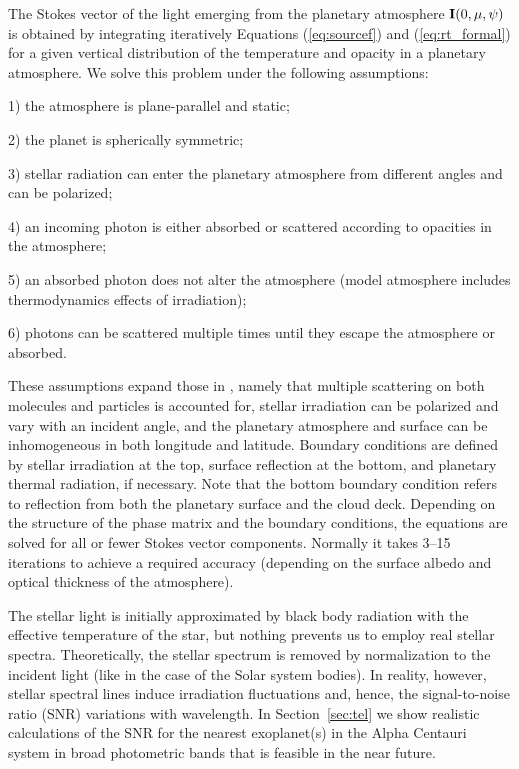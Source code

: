 \documentclass{emulateapj}
\begin{document}
The Stokes vector of the light emerging from the planetary atmosphere ${\bf I}(0,\mu,\psi)$ is obtained 
by integrating iteratively Equations (\ref{eq:sourcef}) and (\ref{eq:rt_formal}) for a given vertical 
distribution of the temperature and opacity in a planetary atmosphere. 
We solve this problem under the following assumptions:

	 1) the atmosphere is plane-parallel and static;

	 2) the planet is spherically symmetric;

	 3) stellar radiation can enter the planetary atmosphere from different angles and can be polarized;

	 4) an incoming photon is either absorbed or scattered according to opacities in the atmosphere;

	 5) an absorbed photon does not alter the atmosphere (model atmosphere includes thermodynamics effects 
	      of irradiation);

     6) photons can be scattered multiple times until they escape the atmosphere or absorbed.

These assumptions expand those in \cite{fluri&berd2010}, namely that multiple scattering
on both molecules and particles is accounted for, stellar irradiation can be polarized 
and vary with an incident angle, 
and the planetary atmosphere and surface can be inhomogeneous in both longitude and latitude.
Boundary conditions are defined by stellar irradiation at the top, 
surface reflection at the bottom, and planetary thermal radiation, if necessary. 
Note that the bottom boundary condition refers to reflection from both the planetary surface 
and the cloud deck. 
Depending on the structure of the phase matrix and the boundary conditions, the equations are solved 
for all or fewer Stokes vector components. Normally it takes 3--15 iterations to achieve 
a required accuracy (depending on the surface albedo and optical thickness of the atmosphere).

The stellar light is initially approximated by black body radiation
with the effective temperature of the star, but nothing prevents us to employ real stellar
spectra. Theoretically, the stellar spectrum is removed by normalization to the incident light
(like in the case of the Solar system bodies). In reality, however, stellar spectral lines 
induce irradiation fluctuations and, hence, the signal-to-noise ratio (SNR) variations with wavelength. 
In Section~\ref{sec:tel} we show realistic calculations of the SNR for the nearest exoplanet(s) 
in the Alpha Centauri system in broad photometric bands that is feasible in the near future.
\end{document}
